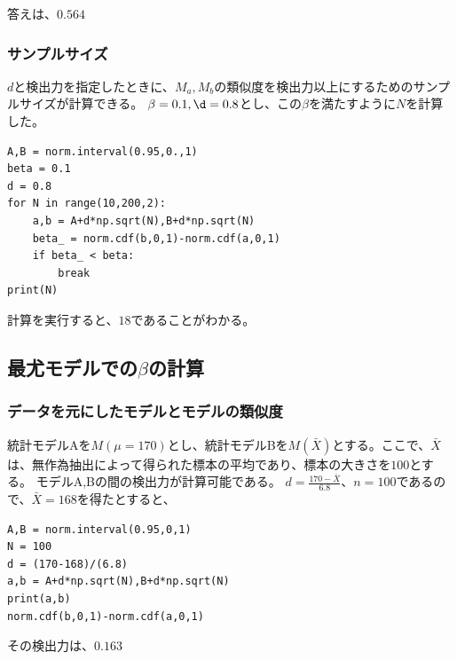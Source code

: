 答えは、$0.564$


\subsubsection{サンプルサイズ}
$d$と検出力を指定したときに、$M_a,M_b$の類似度を検出力以上にするためのサンプルサイズが計算できる。
$\beta=0.1,\d=0.8$とし、この$\beta$を満たすように$N$を計算した。

\begin{lstlisting}
A,B = norm.interval(0.95,0.,1)
beta = 0.1
d = 0.8
for N in range(10,200,2):
    a,b = A+d*np.sqrt(N),B+d*np.sqrt(N)
    beta_ = norm.cdf(b,0,1)-norm.cdf(a,0,1)
    if beta_ < beta:
        break
print(N)
\end{lstlisting}
計算を実行すると、$18$であることがわかる。



\subsection{最尤モデルでの$\beta$の計算}
\subsubsection{データを元にしたモデルとモデルの類似度}
統計モデルAを$M(\mu=170)$とし、統計モデルBを$M(\bar{X})$とする。ここで、$\bar{X}$は、無作為抽出によって得られた標本の平均であり、標本の大きさを$100$とする。
モデルA,Bの間の検出力が計算可能である。
$d=\frac{170-\bar{X}}{6.8}$、$n=100$であるので、$\bar{X}=168$を得たとすると、
\begin{lstlisting}
A,B = norm.interval(0.95,0,1)
N = 100
d = (170-168)/(6.8)
a,b = A+d*np.sqrt(N),B+d*np.sqrt(N)
print(a,b)
norm.cdf(b,0,1)-norm.cdf(a,0,1)
\end{lstlisting}
その検出力は、$0.163$


